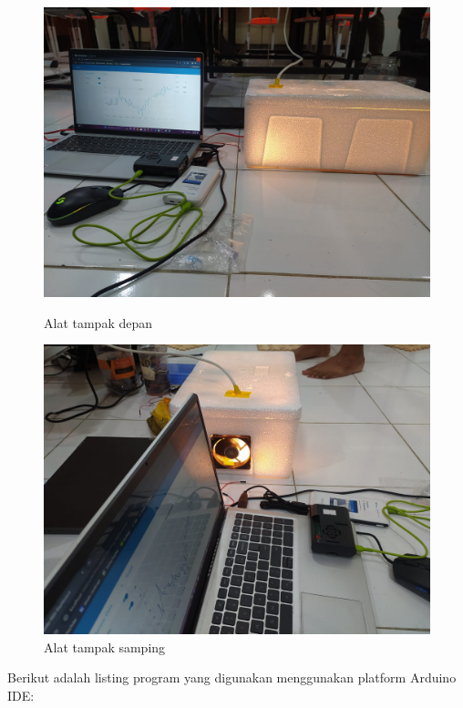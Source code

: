     \begin{figure}[h]
    \centering
    \begin{minipage}{.48\textwidth}
        \centering
        \includegraphics[width=\linewidth]{image/foto_alat1.jpg}
        \caption{Alat tampak depan}
        \label{fig:gambar-kiri}
    \end{minipage}
    \hfill
    \begin{minipage}{.48\textwidth}
        \centering
        \includegraphics[width=\linewidth]{image/foto_alat2.jpg}
        \caption{Alat tampak samping}
        \label{fig:gambar-kanan}
    \end{minipage}
\end{figure}

Berikut adalah listing program yang digunakan menggunakan platform Arduino IDE:
